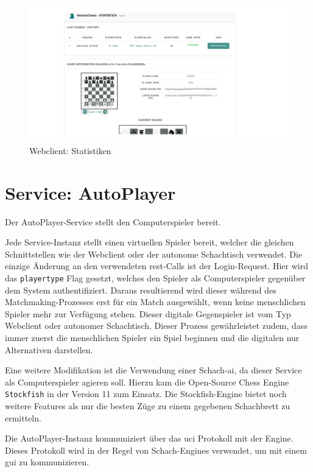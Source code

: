 \begin{figure}
\centering
\includegraphics{images/ATC_statistics.png}
\caption{Webclient: Statistiken \label{ATC_statistics}}
\end{figure}

\hypertarget{service-autoplayer}{%
\section{Service: AutoPlayer}\label{service-autoplayer}}

Der AutoPlayer-Service stellt den Computerspieler bereit.

Jede Service-Instanz stellt einen virtuellen Spieler bereit, welcher die
gleichen Schnittstellen wie der Webclient oder der autonome Schachtisch
verwendet. Die einzige Änderung an den verwendeten \gls{rest}-Calls ist
der Login-Request. Hier wird das \passthrough{\lstinline!playertype!}
Flag gesetzt, welches den Spieler als Computerspieler gegenüber dem
System authentifiziert. Daraus resultierend wird dieser während des
Matchmaking-Prozesses erst für ein Match ausgewählt, wenn keine
menschlichen Spieler mehr zur Verfügung stehen. Dieser digitale
Gegenspieler ist vom Typ Webclient oder autonomer Schachtisch. Dieser
Prozess gewährleistet zudem, dass immer zuerst die menschlichen Spieler
ein Spiel beginnen und die digitalen nur Alternativen darstellen.

Eine weitere Modifikation ist die Verwendung einer Schach-\gls{ai}, da
dieser Service als Computerspieler agieren soll. Hierzu kam die
Open-Source Chess Engine
\passthrough{\lstinline!Stockfish!}\cite{stockfish} in der Version
11 zum Einsatz. Die Stockfish-Engine bietet noch weitere Features als
nur die besten Züge zu einem gegebenen Schachbrett zu ermitteln.

Die AutoPlayer-Instanz kommuniziert über das \gls{uci}
Protokoll\cite{uciprotocol} mit der Engine. Dieses Protokoll wird in
der Regel von Schach-Engines verwendet, um mit einem \gls{gui} zu
kommunizieren.


